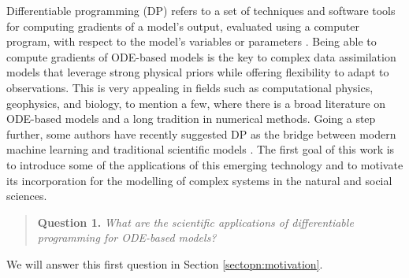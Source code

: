 Differentiable programming (DP) refers to a set of techniques and software tools for computing gradients of a model's output, evaluated using a computer program, with respect to the model's variables or parameters \cite{Shen_diff_modelling, Innes_Zygote, blondel2024elements}.
Being able to compute gradients of ODE-based models is the key to complex data assimilation models that leverage strong physical priors while offering flexibility to adapt to observations.
This is very appealing in fields such as computational physics, geophysics, and biology, to mention a few, where there is a broad literature on ODE-based models and a long tradition in numerical methods. 
Going a step further, some authors have recently suggested DP as the bridge between modern machine learning and traditional scientific models \cite{Ramsundar_Krishnamurthy_Viswanathan_2021, Shen_diff_modelling, Gelbrecht-differential-programming-Earth, rackauckas2021generalized}. 
The first goal of this work is to introduce some of the applications of this emerging technology and to motivate its incorporation for the modelling of complex systems in the natural and social sciences. 
\begin{quote}
    \textbf{Question 1. }
    \textit{What are the scientific applications of differentiable programming for ODE-based models?}
\end{quote}
We will answer this first question in Section \ref{sectopn:motivation}. 

